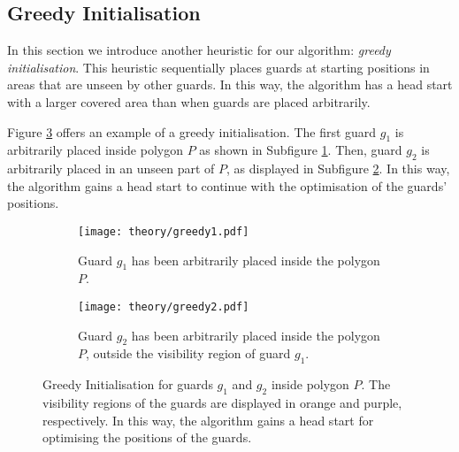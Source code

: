 \subsection{Greedy Initialisation}
\label{sec:greedy}
In this section we  introduce another heuristic for our algorithm: \textit{greedy initialisation}. This heuristic sequentially places guards at starting positions in areas that are unseen by other guards. In this way, the algorithm has a head start with a larger covered area than when guards are placed arbitrarily.

Figure \ref{fig:greedy} offers an example of a greedy initialisation. The first guard $g_1$ is arbitrarily placed inside polygon $P$ as shown in Subfigure \ref{fig:greedy1}. Then, guard $g_2$ is arbitrarily placed in an unseen part of $P$, as displayed in Subfigure \ref{fig:greedy2}. In this way, the algorithm gains a head start to continue with the optimisation of the guards' positions.

\begin{figure}[h!]
    \centering
    \begin{subfigure}{0.45\textwidth}
        \texttt{[image: theory/greedy1.pdf]}
        \caption{Guard $g_1$ has been arbitrarily placed inside the polygon $P$.}
        \label{fig:greedy1}
    \end{subfigure}
    \hfill
    \begin{subfigure}{0.45\textwidth}
        \texttt{[image: theory/greedy2.pdf]}
        \caption{Guard $g_2$ has been arbitrarily placed inside the polygon $P$, outside the visibility region of guard $g_1$.}
        \label{fig:greedy2}
    \end{subfigure}
    \caption{Greedy Initialisation for guards $g_1$ and $g_2$ inside polygon $P$. The visibility regions of the guards are displayed in orange and purple, respectively. In this way, the algorithm gains a head start for optimising the positions of the guards.}
    \label{fig:greedy}
\end{figure}
